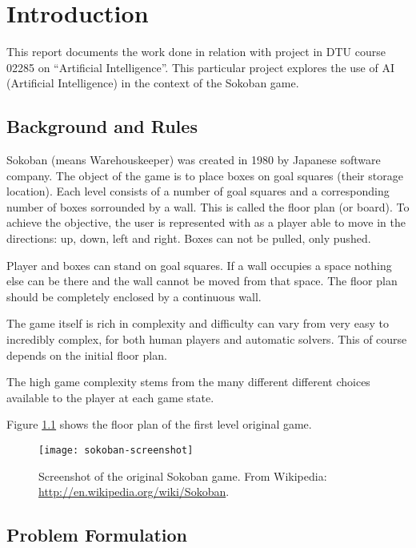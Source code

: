 \chapter{Introduction}

This report documents the work done in relation with project in DTU
course 02285 on ``Artificial Intelligence''.  This particular project
explores the use of AI (Artificial Intelligence) in the context of the
Sokoban game.

\section{Background and Rules}

Sokoban (means Warehouskeeper) was created in 1980 by Japanese
software company. The object of the game is to place boxes on goal
squares (their storage location).  Each level consists of a number of
goal squares and a corresponding number of boxes sorrounded by a
wall. This is called the floor plan (or board). To achieve the
objective, the user is represented with as a player able to move in
the directions: up, down, left and right. Boxes can not be pulled,
only pushed. \citep{cgw:sokoban}


Player and boxes can stand on goal squares. If a wall occupies a space
nothing else can be there and the wall cannot be moved from that
space.  The floor plan should be completely enclosed by a continuous
wall.

The game itself is rich in complexity and difficulty can vary from
very easy to incredibly complex, for both human players and automatic
solvers. This of course depends on the initial floor plan.

The high game complexity stems from the many different different
choices available to the player at each game state.

Figure \ref{fig:soko-org-screen} shows the floor plan of the first
level original game.

\begin{figure}
  \centering
  \texttt{[image: sokoban-screenshot]}
  \caption{Screenshot of the original Sokoban game. From Wikipedia:
    \url{http://en.wikipedia.org/wiki/Sokoban}.}
  \label{fig:soko-org-screen}
\end{figure}
\section{Problem Formulation}



